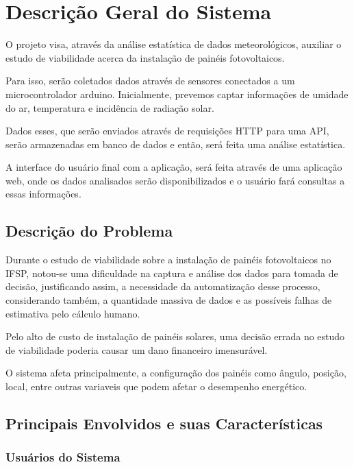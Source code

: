 \chapter{Descrição Geral do Sistema}

O projeto visa, através da análise estatística de dados meteorológicos, auxiliar o estudo de viabilidade acerca da instalação de painéis fotovoltaicos.

Para isso, serão coletados dados através de sensores conectados a um microcontrolador arduino. Inicialmente, prevemos captar informações de umidade do ar, temperatura e incidência de radiação solar.

Dados esses, que serão enviados através de requisições HTTP para uma API, serão armazenadas em banco de dados e então, será feita uma análise estatística.

A interface do usuário final com a aplicação, será feita através de uma aplicação web, onde os dados analisados serão disponibilizados e o usuário fará consultas a essas informações.

\section{Descrição do Problema}

Durante o estudo de viabilidade sobre a instalação de painéis fotovoltaicos no IFSP, notou-se uma dificuldade na captura e análise dos dados para tomada de decisão, justificando assim, a necessidade da automatização desse processo, considerando também, a quantidade massiva de dados e as possíveis falhas de estimativa pelo cálculo humano.

Pelo alto de custo de instalação de painéis solares, uma decisão errada no estudo de viabilidade poderia causar um dano financeiro imensurável.

O sistema afeta principalmente, a configuração dos painéis como ângulo, posição, local, entre outras variaveis que podem afetar o desempenho energético.

\section{Principais Envolvidos e suas Características}

\subsection{Usuários do Sistema}

